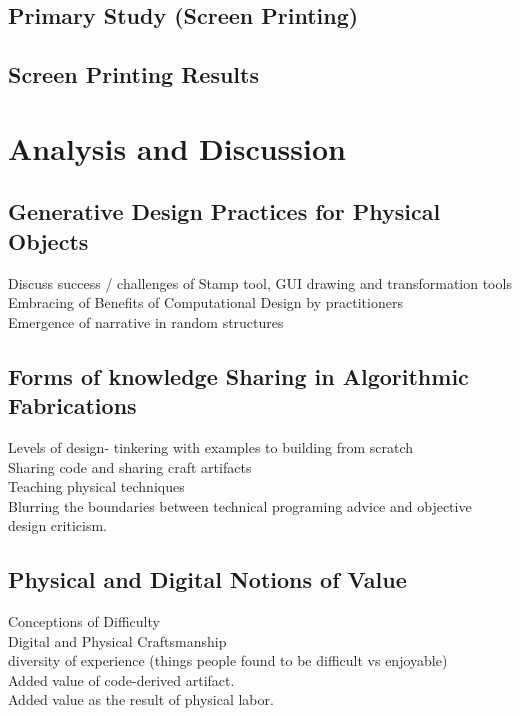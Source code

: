 \documentclass{sigchi}
\begin{document}
	\subsection{Primary Study (Screen Printing)}
	\subsection{Screen Printing Results}
	
	
\section{Analysis and Discussion}
\subsection{Generative Design Practices for Physical Objects}
Discuss success / challenges of Stamp tool, GUI drawing and transformation tools\\
Embracing of Benefits of Computational Design by practitioners\\
Emergence of narrative in random structures

\subsection{Forms of knowledge Sharing in Algorithmic Fabrications}
Levels of design- tinkering with examples to building from scratch\\
Sharing code and sharing craft artifacts\\
Teaching physical techniques\\
Blurring the boundaries between technical programing advice and objective design criticism.

\subsection{Physical and Digital Notions of Value}
Conceptions of Difficulty\\
Digital and Physical Craftsmanship\\
diversity of experience (things people found to be difficult vs enjoyable)\\
Added value of code-derived artifact.\\
Added value as the result of physical labor.
\end{document}
